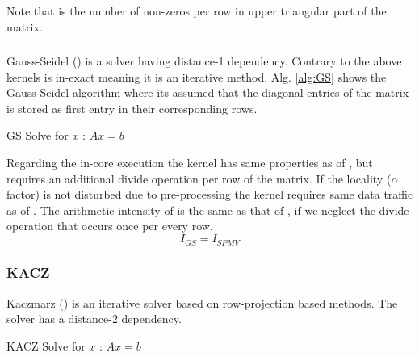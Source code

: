 Note that \NNZRSYMM is the number of non-zeros per row in upper triangular part of the matrix.

\subsubsection{\GS}
Gauss-Seidel (\GS) is a solver having distance-1 dependency. Contrary to the above kernels \GS is in-exact meaning it is an iterative method. Alg. \ref{alg:GS} shows the Gauss-Seidel algorithm where its assumed that the diagonal entries of the matrix is stored as first entry in their corresponding rows.
\begin{algorithm}[H]
	\caption{GS Solve for $x$ : $Ax=b$} 
	\label{alg:GS}
	\begin{algorithmic}[1]
		\ENDFOR
		\ENDFOR
	\end{algorithmic}
\end{algorithm}
Regarding the in-core execution the kernel has same properties as of \SpMV, but requires an additional divide operation per row of the matrix. If the locality ($\alpha$ factor) is not disturbed due to pre-processing the kernel requires same data traffic as of \SpMV. The arithmetic intensity of \GS is the same as that of \SpMV, if we neglect the divide operation that occurs once per every row.
\begin{equation}
\label{eq:GS_intensity}
I_{GS} = I_{SPMV}
\end{equation}

\subsubsection{KACZ}
Kaczmarz (\KACZ) is an iterative solver based on row-projection based methods. The solver has a distance-2 dependency.
\begin{algorithm}[H]
	\caption{KACZ Solve for $x$ : $Ax=b$} 
	\label{alg:KACZ}
	\begin{algorithmic}[1]
		\ENDFOR
		\ENDFOR
		\ENDFOR
	\end{algorithmic}
\end{algorithm}

